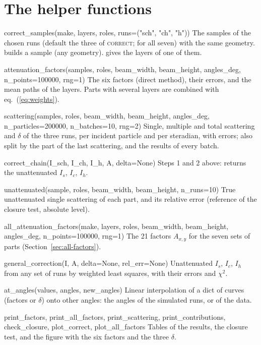 \section{The helper functions}

\begin{fnbox}{correct\_samples(make, layers, roles, runs=("sch", "ch", "h"))}
The samples of the chosen runs (default the three of \textsc{correct};  for all seven) with the same geometry.  builds a sample (any geometry).
 gives the layers of one of them.
\end{fnbox}
\begin{fnbox}{attenuation\_factors(samples, roles, beam\_width, beam\_height, angles\_deg, n\_points=100000, rng=1)}
The six factors (direct method), their errors, and the mean paths of the layers. Parts with several layers are combined with
eq.~(\ref{eq:weights}).
\end{fnbox}
\begin{fnbox}{scattering(samples, roles, beam\_width, beam\_height, angles\_deg, n\_particles=200000, n\_batches=10, rng=2)}
Single, multiple and total scattering and $\delta$ of the three runs, per incident particle and per steradian, with errors; also split by
the part of the last scattering, and the results of every batch.
\end{fnbox}
\begin{fnbox}{correct\_chain(I\_sch, I\_ch, I\_h, A, delta=None)}
Steps 1 and 2 above: returns the unattenuated $I_s$, $I_c$, $I_h$.
\end{fnbox}
\begin{fnbox}{unattenuated(sample, roles, beam\_width, beam\_height, n\_runs=10)}
True unattenuated single scattering of each part, and its relative error (reference of the closure test, absolute level).
\end{fnbox}
\begin{fnbox}{all\_attenuation\_factors(make, layers, roles, beam\_width, beam\_height, angles\_deg, n\_points=100000, rng=1)}
The 21 factors $A_{x,y}$ for the seven sets of parts (Section~\ref{sec:all-factors}).
\end{fnbox}
\begin{fnbox}{general\_correction(I, A, delta=None, rel\_err=None)}
Unattenuated $I_s$, $I_c$, $I_h$ from any set of runs by weighted least squares, with their errors and $\chi^2$.
\end{fnbox}
\begin{fnbox}{at\_angles(values, angles, new\_angles)}
Linear interpolation of a dict of curves (factors or $\delta$) onto other angles: the angles of the simulated runs, or of the data.
\end{fnbox}
\begin{fnbox}{print\_factors, print\_all\_factors, print\_scattering, print\_contributions, check\_closure, plot\_correct, plot\_all\_factors}
Tables of the results, the closure test, and the figure with the six factors and the three $\delta$.
\end{fnbox}

